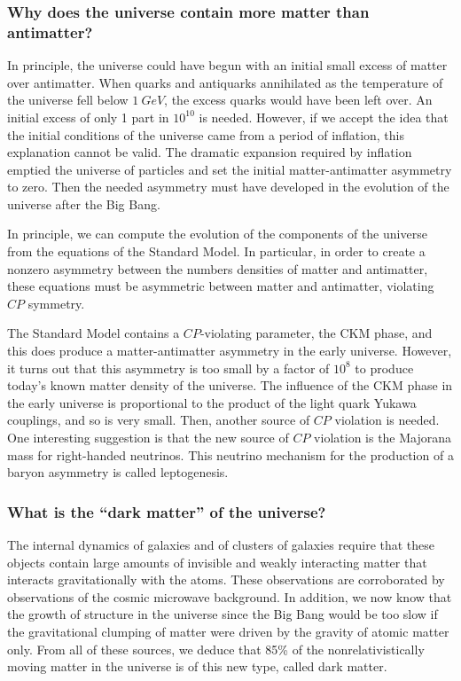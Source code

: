\documentclass[../../main/main.tex]{subfiles}
\begin{document}
\subsubsection{Why does the universe contain more matter than antimatter?}
In principle, the universe could have begun with an initial small excess of matter over antimatter. When quarks and antiquarks annihilated as the temperature of the universe fell below \( 1 \ \si{GeV} \), the excess quarks would have been left over. An initial excess of only 1 part in \( 10^{10} \) is needed. However, if we accept the idea that the initial conditions of the universe came from a period of inflation, this explanation cannot be valid. The dramatic expansion required by inflation emptied the universe of particles and set the initial matter-antimatter asymmetry to zero. Then the needed asymmetry must have developed in the evolution of the universe after the Big Bang.

In principle, we can compute the evolution of the components of the universe from the equations of the Standard Model. In particular, in order to create a nonzero asymmetry between the numbers densities of matter and antimatter, these equations must be asymmetric between matter and antimatter, violating \( CP \) symmetry.

The Standard Model contains a \( CP \)-violating parameter, the CKM phase, and this does produce a matter-antimatter asymmetry in the early universe. However, it turns out that this asymmetry is too small by a factor of \( 10^8 \) to produce today's known matter density of the universe. The influence of the CKM phase in the early universe is proportional to the product of the light quark Yukawa couplings, and so is very small. Then, another source of \( CP \) violation is needed. One interesting suggestion is that the new source of \( CP \) violation is the Majorana mass for right-handed neutrinos. This neutrino mechanism for the production of a baryon asymmetry is called leptogenesis.


\subsubsection{What is the ``dark matter'' of the universe?}
The internal dynamics of galaxies and of clusters of galaxies require that these objects contain large amounts of invisible and weakly interacting matter that interacts gravitationally with the atoms. These observations are corroborated by observations of the cosmic microwave background. In addition, we now know that the growth of structure in the universe since the Big Bang would be too slow if the gravitational clumping of matter were driven by the gravity of atomic matter only. From all of these sources, we deduce that 85\% of the nonrelativistically moving matter in the universe is of this new type, called dark matter.
\end{document}
